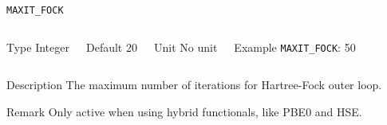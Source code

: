 \documentclass[xcolor=dvipsnames,t]{beamer}
\begin{document}
\begin{frame}[allowframebreaks]{\texttt{MAXIT\_FOCK}} \label{MAXIT_FOCK}
\vspace*{-12pt}
\begin{columns}
\begin{block}{Type}
Integer
\end{block}

\begin{block}{Default}
20
\end{block}

\begin{block}{Unit}
No unit
\end{block}

\begin{block}{Example}
\texttt{MAXIT\_FOCK}: 50
\end{block}
\end{columns}

\begin{block}{Description}
The maximum number of iterations for Hartree-Fock outer loop.
\end{block}

\begin{block}{Remark}
Only active when using hybrid functionals, like PBE0 and HSE. 
\end{block}

\end{frame}
\end{document}
